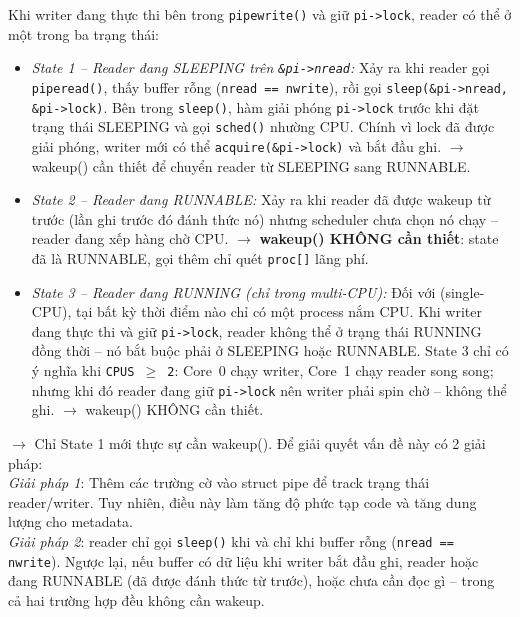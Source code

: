 \documentclass[12pt,a4paper]{article}
\newcommand{\code}[1]{\texttt{#1}}
\begin{document}
Khi writer đang thực thi bên trong \code{pipewrite()} và giữ \code{pi->lock}, reader
có thể ở một trong ba trạng thái:
\begin{itemize}
    \item \textit{State 1 -- Reader đang SLEEPING trên \code{\&pi->nread}:}
    Xảy ra khi reader gọi \code{piperead()}, thấy buffer rỗng
    (\code{nread == nwrite}), rồi gọi \code{sleep(\&pi->nread, \&pi->lock)}.
    Bên trong \code{sleep()}, hàm giải phóng \code{pi->lock} trước khi đặt
    trạng thái SLEEPING và gọi \code{sched()} nhường CPU.
    Chính vì lock đã được giải phóng, writer mới có thể \code{acquire(\&pi->lock)}
    và bắt đầu ghi.
    $\to$ wakeup() cần thiết để chuyển reader từ SLEEPING sang RUNNABLE.

    \item \textit{State 2 -- Reader đang RUNNABLE:}
    Xảy ra khi reader đã được wakeup từ trước (lần ghi trước đó đánh thức nó) nhưng
    scheduler chưa chọn nó chạy -- reader đang xếp hàng chờ CPU.
    $\to$ \textbf{wakeup() KHÔNG cần thiết}: state đã là RUNNABLE, gọi thêm chỉ
    quét \code{proc[]} lãng phí.

    \item \textit{State 3 -- Reader đang RUNNING (chỉ trong multi-CPU):}
    Đối với (single-CPU), tại bất kỳ thời điểm nào chỉ có
    một process nắm CPU. Khi writer đang thực thi và giữ \code{pi->lock}, reader
    không thể ở trạng thái RUNNING đồng thời -- nó bắt buộc phải ở
    SLEEPING hoặc RUNNABLE. State 3 chỉ có ý nghĩa khi \code{CPUS $\geq$ 2}: Core~0
    chạy writer, Core~1 chạy reader song song; nhưng khi đó reader đang giữ
    \code{pi->lock} nên writer phải spin chờ -- không thể ghi.
    $\to$ wakeup() KHÔNG cần thiết.
\end{itemize}

$\to$ Chỉ State 1 mới thực sự cần wakeup(). Để giải quyết vấn đề này có 2 giải pháp: \\

\textit{Giải pháp 1}: Thêm các trường cờ vào struct pipe để track trạng thái reader/writer. 
Tuy nhiên, điều này làm tăng độ phức tạp code và tăng dung lượng cho metadata.\\

\textit{Giải pháp 2}: reader chỉ gọi \code{sleep()} khi và chỉ khi buffer rỗng
(\code{nread == nwrite}). Ngược lại, nếu buffer có dữ liệu khi writer bắt đầu ghi,
reader hoặc đang RUNNABLE (đã được đánh thức từ trước), hoặc chưa cần đọc gì --
trong cả hai trường hợp đều không cần wakeup.
\end{document}
